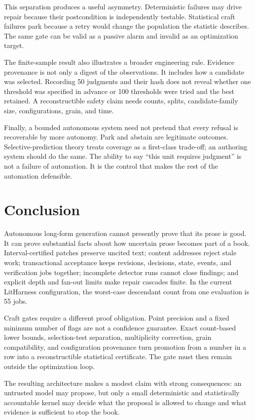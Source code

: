 \documentclass[11pt]{article}
\begin{document}
This separation produces a useful asymmetry. Deterministic failures may drive repair because
their postcondition is independently testable. Statistical craft failures park because a
retry would change the population the statistic describes. The same gate can be valid as a
passive alarm and invalid as an optimization target.

The finite-sample result also illustrates a broader engineering rule. Evidence provenance is
not only a digest of the observations. It includes how a candidate was selected. Recording
50 judgments and their hash does not reveal whether one threshold was specified in advance or
100 thresholds were tried and the best retained. A reconstructible safety claim needs counts,
splits, candidate-family size, configurations, grain, and time.

Finally, a bounded autonomous system need not pretend that every refusal is recoverable by
more autonomy. Park and abstain are legitimate outcomes. Selective-prediction theory treats
coverage as a first-class trade-off; an authoring system should do the same. The ability to
say ``this unit requires judgment'' is not a failure of automation. It is the control that
makes the rest of the automation defensible.

\section{Conclusion}

Autonomous long-form generation cannot presently prove that its prose is good. It can prove
substantial facts about how uncertain prose becomes part of a book. Interval-certified
patches preserve uncited text; content addresses reject stale work; transactional acceptance
keeps revisions, decisions, state, events, and verification jobs together; incomplete
detector runs cannot close findings; and explicit depth and fan-out limits make repair
cascades finite. In the current LitHarness configuration, the worst-case descendant count
from one evaluation is 55 jobs.

Craft gates require a different proof obligation. Point precision and a fixed minimum number
of flags are not a confidence guarantee. Exact count-based lower bounds, selection-test
separation, multiplicity correction, grain compatibility, and configuration provenance turn
promotion from a number in a row into a reconstructible statistical certificate. The gate
must then remain outside the optimization loop.

The resulting architecture makes a modest claim with strong consequences: an untrusted model
may propose, but only a small deterministic and statistically accountable kernel may decide
what the proposal is allowed to change and what evidence is sufficient to stop the book.
\end{document}
